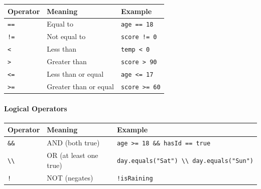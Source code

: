 \documentclass[
  justified,
  openright,
]{tufte-book}
\let\subsection\paragraph
\let\paragraph\paragraph
\let\subsection\paragraph
\let\paragraph\paragraph
\begin{document}
\begin{fullwidth}{\def\LTcaptype{none} %
\begin{longtable}[]{@{}lll@{}}
\toprule\noalign{}
Operator & Meaning & Example \\
\midrule\noalign{}
\endhead
\bottomrule\noalign{}
\endlastfoot
\texttt{==} & Equal to & \texttt{age\ ==\ 18} \\
\texttt{!=} & Not equal to & \texttt{score\ !=\ 0} \\
\texttt{\textless{}} & Less than & \texttt{temp\ \textless{}\ 0} \\
\texttt{\textgreater{}} & Greater than &
\texttt{score\ \textgreater{}\ 90} \\
\texttt{\textless{}=} & Less than or equal &
\texttt{age\ \textless{}=\ 17} \\
\texttt{\textgreater{}=} & Greater than or equal &
\texttt{score\ \textgreater{}=\ 60} \\
\end{longtable}
}
\end{fullwidth}

\subsection{Logical Operators}\label{logical-operators-1}

\begin{fullwidth}{\def\LTcaptype{none} %
\begin{longtable}[]{@{}
  >{\raggedright\arraybackslash}p{}
  >{\raggedright\arraybackslash}p{}
  >{\raggedright\arraybackslash}p{}@{}}
\toprule\noalign{}
\begin{minipage}[b]{\linewidth}\raggedright
Operator
\end{minipage} & \begin{minipage}[b]{\linewidth}\raggedright
Meaning
\end{minipage} & \begin{minipage}[b]{\linewidth}\raggedright
Example
\end{minipage} \\
\midrule\noalign{}
\endhead
\bottomrule\noalign{}
\endlastfoot
\texttt{\&\&} & AND (both true) &
\texttt{age\ \textgreater{}=\ 18\ \&\&\ hasId\ ==\ true} \\
\texttt{\textbackslash{}\textbar{}\textbackslash{}\textbar{}} & OR (at
least one true) &
\texttt{day.equals("Sat")\ \textbackslash{}\textbar{}\textbackslash{}\textbar{}\ day.equals("Sun")} \\
\texttt{!} & NOT (negates) & \texttt{!isRaining} \\
\end{longtable}
}
\end{fullwidth}
\end{document}
